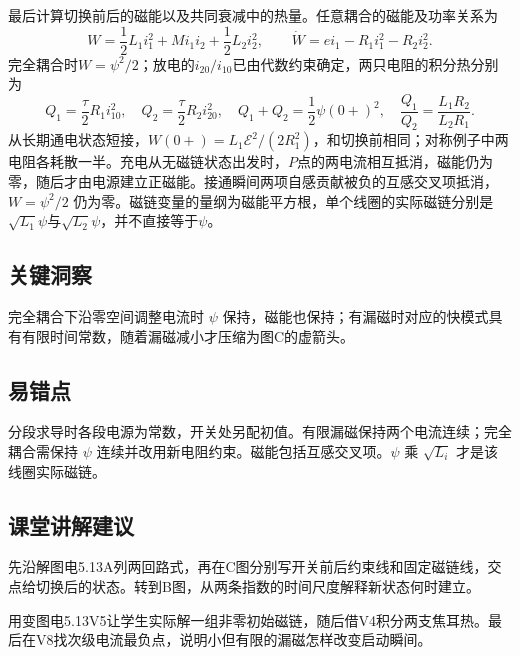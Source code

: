 \documentclass[UTF8,fontset=fandol,a4paper,11pt]{ctexart}
\begin{document}
最后计算切换前后的磁能以及共同衰减中的热量。任意耦合的磁能及功率关系为
\[
W=\frac12L_1i_1^2+Mi_1i_2+\frac12L_2i_2^2,\qquad
\dot W=e i_1-R_1i_1^2-R_2i_2^2.
\]
完全耦合时$W=\psi^2/2$；放电的$i_{20}/i_{10}$已由代数约束确定，两只电阻的积分热分别为
\[
Q_1=\frac\tau2R_1i_{10}^2,\quad Q_2=\frac\tau2R_2i_{20}^2,\quad
Q_1+Q_2=\frac12\psi(0+)^2,\quad
\frac{Q_1}{Q_2}=\frac{L_1R_2}{L_2R_1}.
\]
从长期通电状态短接，$W(0+)=L_1\mathcal E^2/(2R_1^2)$，和切换前相同；对称例子中两电阻各耗散一半。充电从无磁链状态出发时，$P$点的两电流相互抵消，磁能仍为零，随后才由电源建立正磁能。接通瞬间两项自感贡献被负的互感交叉项抵消，$W=\psi^2/2$ 仍为零。磁链变量的量纲为磁能平方根，单个线圈的实际磁链分别是$\sqrt{L_1}\psi$与$\sqrt{L_2}\psi$，并不直接等于$\psi$。




\subsection*{关键洞察}

完全耦合下沿零空间调整电流时 $\psi$ 保持，磁能也保持；有漏磁时对应的快模式具有有限时间常数，随着漏磁减小才压缩为图C的虚箭头。



\subsection*{易错点}

分段求导时各段电源为常数，开关处另配初值。有限漏磁保持两个电流连续；完全耦合需保持 $\psi$ 连续并改用新电阻约束。磁能包括互感交叉项。$\psi$ 乘 $\sqrt{L_i}$ 才是该线圈实际磁链。



\subsection*{课堂讲解建议}

先沿解图电5.13A列两回路式，再在C图分别写开关前后约束线和固定磁链线，交点给切换后的状态。转到B图，从两条指数的时间尺度解释新状态何时建立。

用变图电5.13V5让学生实际解一组非零初始磁链，随后借V4积分两支焦耳热。最后在V8找次级电流最负点，说明小但有限的漏磁怎样改变启动瞬间。
\end{document}
